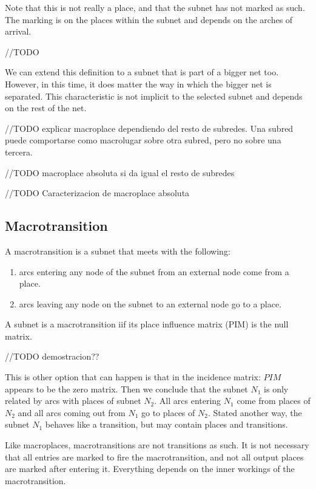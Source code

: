 {Note that this is not really a place, and that the subnet has not marked as such. The marking is on the places within the subnet and depends on the arches of arrival.
\begin{example}[Macroplace]
//TODO
\end{example}

We can extend this definition to a subnet that is part of a bigger net too. However, in this time, it does matter the way in which the bigger net is separated. This characteristic is not implicit to the selected subnet and depends on the rest of the net.

//TODO explicar macroplace dependiendo del resto de subredes. Una subred puede comportarse como macrolugar sobre otra subred, pero no sobre una tercera.

//TODO macroplace absoluta si da igual el resto de subredes

//TODO Caracterizacion de macroplace absoluta

\subsection{Macrotransition}
\begin{definition}[Macrotransition]
A macrotransition is a subnet that meets with the following:
\begin{enumerate}
 \item arcs entering any node of the subnet from an external node come from a place.
 \item arcs leaving any node on the subnet to an external node go to a place.
\end{enumerate}
\end{definition}

\begin{proposition}
A subnet is a macrotransition iif its place influence matrix (PIM) is the null matrix.
\end{proposition}
//TODO demostracion??

This is other option that can happen is that in the incidence matrix: $PIM$ appears to be the zero matrix. Then we conclude that the subnet $N_1$ is only related by arcs with places of subnet $N_2$. All arcs entering $N_1$ come from places of $N_2$ and all arcs coming out from $N_1$ go to places of $N_2$. Stated another way, the subnet $N_1$ behaves like a transition, but may contain places and transitions.

Like macroplaces, macrotransitions are not transitions as such. It is not necessary that all entries are marked to fire the macrotransition, and not all output places are marked after entering it. Everything depends on the inner workings of the macrotransition.

}
